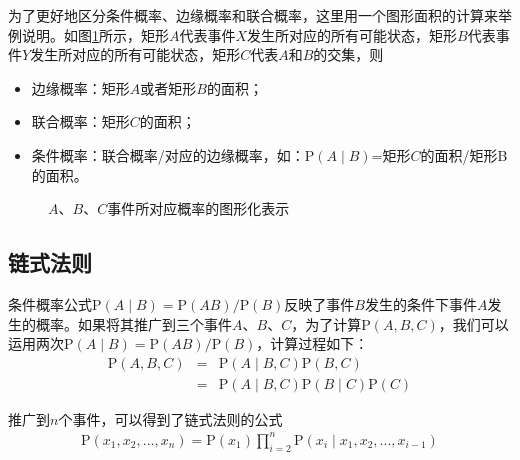 \parinterval 为了更好地区分条件概率、边缘概率和联合概率，这里用一个图形面积的计算来举例说明。如图\ref{fig:2-4}所示，矩形$A$代表事件$X$发生所对应的所有可能状态，矩形$B$代表事件$Y$发生所对应的所有可能状态，矩形$C$代表$A$和$B$的交集，则

\begin{itemize}
\vspace{0.5em}
\item 边缘概率：矩形$A$或者矩形$B$的面积；
\vspace{0.5em}
\item 联合概率：矩形$C$的面积；
\vspace{0.5em}
\item 条件概率：联合概率/对应的边缘概率，如：$\textrm{P}(A \mid B)$=矩形$C$的面积/矩形B的面积。
\vspace{0.5em}
\end{itemize}

\begin{figure}[htp]
\centering

\caption{$A$、$B$、$C$事件所对应概率的图形化表示}
\label{fig:2-4}
\end{figure}


\subsection{链式法则}

\parinterval 条件概率公式$\textrm{P}(A \mid B)=\textrm{P}(AB)/\textrm{P}(B)$反映了事件$B$发生的条件下事件$A$发生的概率。如果将其推广到三个事件$A$、$B$、$C$，为了计算$\textrm{P}(A,B,C)$，我们可以运用两次$\textrm{P}(A \mid B)=\textrm{P}(AB)/\textrm{P}(B)$，计算过程如下：
\begin{eqnarray}
\textrm{P}(A,B,C) & = & \textrm{P}(A \mid B ,C)\textrm{P}(B,C) \nonumber \\
                           & = & \textrm{P}(A \mid B,C)\textrm{P}(B \mid C)\textrm{P}(C)
\label{eq:2-5}
\end{eqnarray}

\parinterval 推广到$n$个事件，可以得到了链式法则的公式
\begin{eqnarray}
\textrm{P}(x_1,x_2,...,x_n)=\textrm{P}(x_1) \prod_{i=2}^n \textrm{P}(x_i \mid x_1,x_2,...,x_{i-1})
\label{eq:2-6}
\end{eqnarray}

